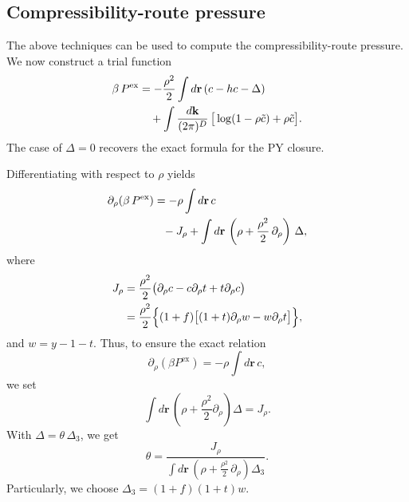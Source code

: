 \documentclass[aip,jcp,reprint,superscriptaddress]{revtex4-1}
\newcommand{\vct}[1]{\mathbf{#1}}
\providecommand{\vr}{} %
\renewcommand{\vr}{\vct{r}}
\newcommand{\vk}{\vct{k}}
\newcommand{\dvk}{\frac{d\vk}{(2\pi)^D}}
\newcommand{\supex}[1]{ { { #1 }^{ \mathrm{ex} } } }
\newcommand{\Pex}{\supex{P}}
\newcommand{\mutex}{\mu^{ \mathrm{ex} }_t}
\begin{document}



\subsection{\label{sec:c-pres}Compressibility-route pressure}

The above techniques can be used to
compute the compressibility-route pressure.
%
We now construct a trial function
\begin{align}
  \beta \, \Pex
&=
 -\frac{ \rho^2 }{ 2 }
 \int d\vr \, (c - h c - \Delta)
 \notag \\
& \quad + \int \dvk \,
  \big[
    \log( 1 - \rho \tilde{c} )
    + \rho \tilde{c}
  \big].
  \label{eq:Ptrial}
\end{align}
%
The case of $\Delta = 0$ recovers the exact formula
for the PY closure\cite{baxterpressure}.

Differentiating with respect to $\rho$ yields
%
\begin{align}
  \partial_\rho ( \beta \, \Pex )
&=
 -\rho \int d\vr \, c
 \notag \\
&\hphantom{=}
 - J_\rho
 + \int d\vr \,
  \left(
    \rho + \frac{ \rho^2 }{ 2 }  \, \partial_\rho
  \right) \, \Delta,
  \label{eq:dPtrial}
\end{align}
%
where
\begin{align*}
  J_\rho
  &= \frac{\rho^2}{2}
  \big(
 \partial_\rho c
 - c \partial_\rho t
 + t \partial_\rho c
\big)
\notag \\
&= \frac{\rho^2}{2}
 \Big\{
 (1+ f)
 \big[
  (1+t) \partial_\rho w
  -w\partial_\rho t
  \big]
 \Big\},
\end{align*}
and $w = y - 1 - t$.
%
Thus, to ensure the exact relation
\[
\partial_\rho (\beta \Pex)
= -\rho \int d\vr \, c,
\]
we set
\[
  \int d\vr \,
  \left(\rho + \frac{\rho^2}{2} \partial_\rho\right) \Delta
  = J_\rho.
\]
With
$\Delta = \theta \, \Delta_3$,
we get
\begin{equation}
  \theta
=
  \frac
  {
    J_\rho
  }
  {
    \int d\vr \,
    \left( \rho + \frac{\rho^2}{2} \, \partial_\rho \right)
    \Delta_3
  }.
  \label{eq:theta}
\end{equation}
%
Particularly, we choose $\Delta_3 = (1+ f) (1 + t) w$.
\end{document}
